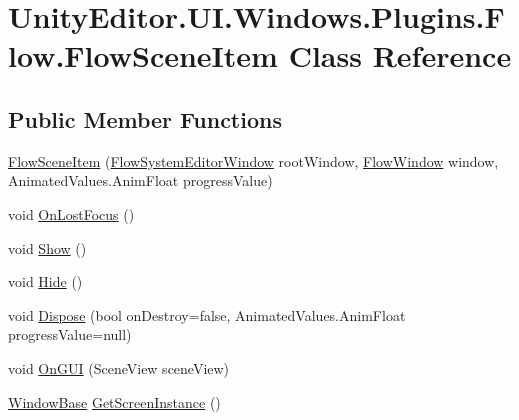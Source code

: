 \hypertarget{class_unity_editor_1_1_u_i_1_1_windows_1_1_plugins_1_1_flow_1_1_flow_scene_item}{}\section{Unity\+Editor.\+U\+I.\+Windows.\+Plugins.\+Flow.\+Flow\+Scene\+Item Class Reference}
\label{class_unity_editor_1_1_u_i_1_1_windows_1_1_plugins_1_1_flow_1_1_flow_scene_item}
\subsection*{Public Member Functions}
\begin{DoxyCompactItemize}
\item 
\hyperlink{class_unity_editor_1_1_u_i_1_1_windows_1_1_plugins_1_1_flow_1_1_flow_scene_item_a2fcc5192330be1366a79d5efb5af6f79}{Flow\+Scene\+Item} (\hyperlink{class_unity_editor_1_1_u_i_1_1_windows_1_1_plugins_1_1_flow_1_1_flow_system_editor_window}{Flow\+System\+Editor\+Window} root\+Window, \hyperlink{class_unity_engine_1_1_u_i_1_1_windows_1_1_plugins_1_1_flow_1_1_flow_window}{Flow\+Window} window, Animated\+Values.\+Anim\+Float progress\+Value)
\item 
void \hyperlink{class_unity_editor_1_1_u_i_1_1_windows_1_1_plugins_1_1_flow_1_1_flow_scene_item_a98e6326a81a8ba64c55543b11dfcb6b2}{On\+Lost\+Focus} ()
\item 
void \hyperlink{class_unity_editor_1_1_u_i_1_1_windows_1_1_plugins_1_1_flow_1_1_flow_scene_item_a366094bb6ca6b7bd0439fb72cc9c59fb}{Show} ()
\item 
void \hyperlink{class_unity_editor_1_1_u_i_1_1_windows_1_1_plugins_1_1_flow_1_1_flow_scene_item_a14e725cb2c7c809f63dc269626afd2db}{Hide} ()
\item 
void \hyperlink{class_unity_editor_1_1_u_i_1_1_windows_1_1_plugins_1_1_flow_1_1_flow_scene_item_a574c64e19eab72a5cdccf9aeb53a95ba}{Dispose} (bool on\+Destroy=false, Animated\+Values.\+Anim\+Float progress\+Value=null)
\item 
void \hyperlink{class_unity_editor_1_1_u_i_1_1_windows_1_1_plugins_1_1_flow_1_1_flow_scene_item_a1e89364d7bc26405109ea4be868ab66f}{On\+G\+U\+I} (Scene\+View scene\+View)
\item 
\hyperlink{class_unity_engine_1_1_u_i_1_1_windows_1_1_window_base}{Window\+Base} \hyperlink{class_unity_editor_1_1_u_i_1_1_windows_1_1_plugins_1_1_flow_1_1_flow_scene_item_a97694f7919897a60e415b3db3a0e19d8}{Get\+Screen\+Instance} ()

\end{DoxyCompactItemize}
